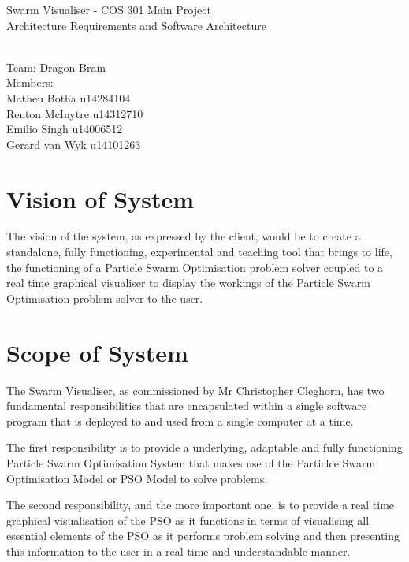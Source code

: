 \documentclass[11pt]{article}
\begin{document}
\begin{titlepage}

\begin{center}
\begin{huge}
Swarm Visualiser - COS 301 Main Project
\\
Architecture Requirements and Software Architecture
\begin{small}
\\
Team: Dragon Brain
\\
Members:
\\
Matheu Botha u14284104
\\
Renton McInytre u14312710
\\
Emilio Singh u14006512
\\
Gerard van Wyk u14101263

\end{small}

\end{huge}
\end{center}
\end{titlepage}

\pagebreak

\tableofcontents

\pagebreak
\section{Vision of System}
The vision of the system, as expressed by the client, would be to create a standalone, fully functioning, experimental and teaching tool that brings to life, the functioning of a Particle Swarm Optimisation problem solver coupled to a real time graphical visualiser to display the workings of the Particle Swarm Optimisation problem solver to the user.

\section{Scope of System}
The Swarm Visualiser, as commissioned by Mr Christopher Cleghorn, has two fundamental responsibilities that are encapsulated within a single software program that is deployed to and used from a single computer at a time.

The first responsibility is to provide a underlying, adaptable and fully functioning Particle Swarm Optimisation System that makes use of the Particlce Swarm Optimisation Model or PSO Model to solve problems.

The second responsibility, and the more important one, is to provide a real time graphical visualisation of the PSO as it functions in terms of visualising all essential elements of the PSO as it performs problem solving and then presenting this information to the user in a real time and understandable manner.
\end{document}
